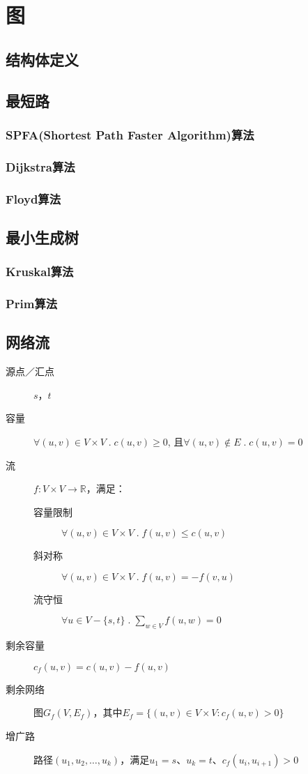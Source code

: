 
\chapter{图}
\section{结构体定义}

\section{最短路}
\subsection{SPFA(Shortest Path Faster Algorithm)算法}
\subsection{Dijkstra算法}
\subsection{Floyd算法}

\section{最小生成树}
\subsection{Kruskal算法}
\subsection{Prim算法}

\section{网络流}
\begin{description}
\item[源点／汇点] $s$，$t$
\item[容量] $\forall (u, v)  \in V \times V \;.\; c(u, v) \geqslant 0$, 且$\forall (u, v) \not\in E\;.\; c(u,v) = 0$
\item[流] $f:V \times V \rightarrow \mathbb{R} $，满足：
\begin{description}
\item[容量限制] $\forall (u, v) \in V \times V \;.\; f(u, v) \leqslant c(u, v) $
\item[斜对称] $\forall (u, v) \in V \times V \;.\; f(u, v) = -f(v, u)$
\item[流守恒] $\forall u \in V-\{s, t\} \;.\;\sum_{w \in V} f(u, w) = 0$
\end{description}
\item[剩余容量] $c_f(u,v) = c(u,v) - f(u,v)$
\item[剩余网络] 图$G_f(V, E_f)$，其中$E_f = \{(u,v) \in V \times V : c_f(u, v) > 0\}$
\item[增广路] 路径$(u_1, u_2, \dots, u_k)$，满足$u_1 = s$、$u_k = t$、$c_f(u_i, u_{i+1}) > 0$
\end{description}
